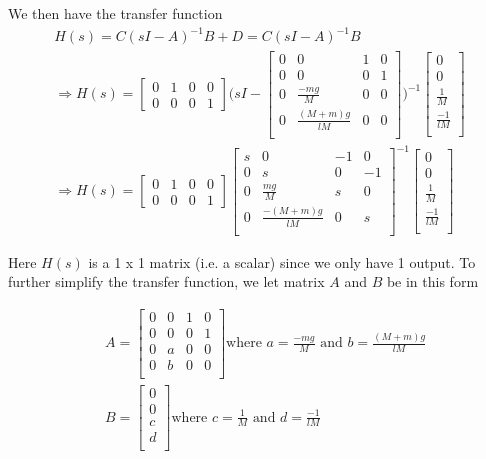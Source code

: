 \documentclass [12pt,letterpaper]{exam}
\begin{document}
We then have the transfer function
\begin{align}
H(s) = C(sI - A)^{-1}B + D = C(sI - A)^{-1}B \\
\Rightarrow H(s) = \begin{bmatrix}
0 & 1 & 0 & 0 \\
0 & 0 & 0 & 1
\end{bmatrix}
\Bigg(sI - \begin{bmatrix}
0 & 0 & 1 & 0 \\
0 & 0 & 0 & 1 \\
0 & \frac{-mg}{M} & 0 & 0 \\
0 & \frac{(M + m)g}{lM} & 0 & 0 \\
\end{bmatrix}
\Bigg)^{-1} \begin{bmatrix}
0 \\
0 \\
\frac{1}{M} \\
\frac{-1}{lM} \\
\end{bmatrix} \\
\Rightarrow H(s) = \begin{bmatrix}
0 & 1 & 0 & 0 \\
0 & 0 & 0 & 1
\end{bmatrix}
\begin{bmatrix}
s & 0 & -1 & 0 \\
0 & s & 0 & -1 \\
0 & \frac{mg}{M} & s & 0 \\
0 & \frac{-(M + m)g}{lM} & 0 & s \\
\end{bmatrix}^{-1} \begin{bmatrix}
0 \\
0 \\
\frac{1}{M} \\
\frac{-1}{lM} \\
\end{bmatrix}
\end{align}

Here $H(s)$ is a 1 x 1 matrix (i.e. a scalar) since we only have 1 output. To further simplify the transfer function, we let matrix $A$ and $B$ be in this form

\begin{align}
& A = \begin{bmatrix}
0 & 0 & 1 & 0 \\
0 & 0 & 0 & 1 \\
0 & a & 0 & 0 \\
0 & b & 0 & 0 \\
\end{bmatrix} \mbox{where } a = \frac{-mg}{M} \mbox{ and } b = \frac{(M + m)g}{lM} \\
& B = \begin{bmatrix}
0 \\
0 \\
c \\
d \\
\end{bmatrix} \mbox{where } c = \frac{1}{M} \mbox{ and } d = \frac{-1}{lM}
\end{align}
\end{document}

